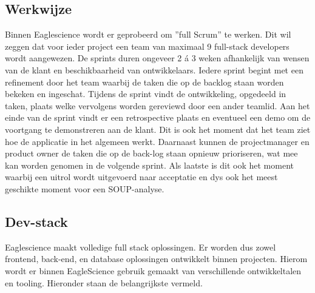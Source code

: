 \subsection{Werkwijze}\label{subsec:ESwerkwijze}
Binnen Eaglescience wordt er geprobeerd om ''full Scrum'' te werken. Dit wil zeggen dat voor ieder project een team van maximaal 9 full-stack developers wordt aangewezen. De sprints duren ongeveer 2 á 3 weken afhankelijk van wensen van de klant en beschikbaarheid van ontwikkelaars. Iedere sprint begint met een refinement door het team waarbij de taken die op de backlog staan worden bekeken en ingeschat. Tijdens de sprint vindt de ontwikkeling, opgedeeld in taken, plaats welke vervolgens worden gereviewd door een ander teamlid. Aan het einde van de sprint vindt er een retrospective plaats en eventueel een demo om de voortgang te demonstreren aan de klant. Dit is ook het moment dat het team ziet hoe de applicatie in het algemeen werkt. Daarnaast kunnen de projectmanager en product owner de taken die op de back-log staan opnieuw prioriseren, wat mee kan worden genomen in de volgende sprint. Als laatste is dit ook het moment waarbij een uitrol wordt uitgevoerd naar acceptatie en dys ook het meest geschikte moment voor een SOUP-analyse.

\subsection{Dev-stack}\label{subsec:ESdev-stack}
Eaglescience maakt volledige full stack oplossingen. Er worden dus zowel frontend, back-end, en database oplossingen ontwikkelt binnen projecten. Hierom wordt er binnen EagleScience gebruik gemaakt van verschillende ontwikkeltalen en tooling. Hieronder staan de belangrijkste vermeld.

